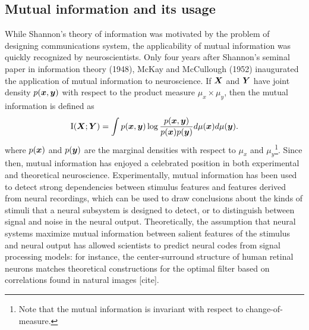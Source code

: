 \documentclass[12pt]{article}
\begin{document}
\subsection{Mutual information and its usage}
While Shannon's theory of information was motivated by the problem of
designing communications system, the applicability of mutual
information was quickly recognized by neuroscientists.  Only four
years after Shannon's seminal paper in information theory (1948),
McKay and McCullough (1952) inaugurated the application of mutual
information to neuroscience.  If $\boldsymbol{X}$ and $\boldsymbol{Y}$ have joint density
$p(\boldsymbol{x}, \boldsymbol{y})$ with respect to the product measure $\mu_x \times \mu_y$, then the mutual information is defined as
\[
\text{I}(\boldsymbol{X};\boldsymbol{Y}) = \int p(\boldsymbol{x}, \boldsymbol{y}) \log \frac{p(\boldsymbol{x}, \boldsymbol{y})}{p(\boldsymbol{x})p(\boldsymbol{y})}d\mu(\boldsymbol{x}) d\mu(\boldsymbol{y}).
\]
where $p(\boldsymbol{x})$ and $p(\boldsymbol{y})$ are the marginal densities with respect to
$\mu_x$ and $\mu_y$\footnote{Note that the mutual information is invariant with respect to change-of-measure.}.  Since then, mutual information has enjoyed a
celebrated position in both experimental and theoretical neuroscience.
Experimentally, mutual information has been used to detect strong
dependencies between stimulus features and features derived from
neural recordings, which can be used to draw conclusions about the
kinds of stimuli that a neural subsystem is designed to detect, or to
distinguish between signal and noise in the neural output.
Theoretically, the assumption that neural systems maximize mutual
information between salient features of the stimulus and neural output
has allowed scientists to predict neural codes from signal processing
models: for instance, the center-surround structure of human retinal
neurons matches theoretical constructions for the optimal filter based
on correlations found in natural images [cite].
\end{document}
